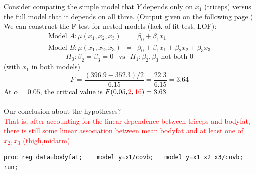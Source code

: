 Consider comparing the simple model that $Y$ depends only on $x_1$ (triceps) versus the full model that it depends on all three.  (Output given on the following page.)\\

We can construct the F-test for nested models (lack of fit test, LOF):
\begin{eqnarray*}
\mbox{Model } A: \mu(x_1,x_2,x_3) & = & \beta_0 + \beta_1 x_1 \\
\mbox{Model } B: \mu(x_1,x_2,x_3) & = & \beta_0 + \beta_1 x_1 + \beta_2 x_2 + \beta_3 x_3 
\end{eqnarray*} 
$$H_0: \beta_2=\beta_3=0 \ \ \mbox{  vs  } \ \ H_1: \beta_2, \beta_3 \mbox{ not both }0$$ 
(with $x_1$ in both models)
$$ F = \frac{(396.9-352.3)/2}{6.15} = \frac{22.3}{6.15}=3.64$$
At $\alpha=0.05$, the critical value is $F(0.05,\textcolor{red}{2},\textcolor{red}{16}) = 3.63$.\\~\\
Our conclusion about the hypotheses?
\textcolor{red}{\\That is, after accounting for the linear dependence between triceps and bodyfat, there is still some linear association between mean bodyfat and at least one of $x_2,x_3$ (thigh,midarm).}

\newpage

\begin{small}
\begin{verbatim}
proc reg data=bodyfat;    model y=x1/covb;   model y=x1 x2 x3/covb; run;
\end{verbatim}
\end{small}

